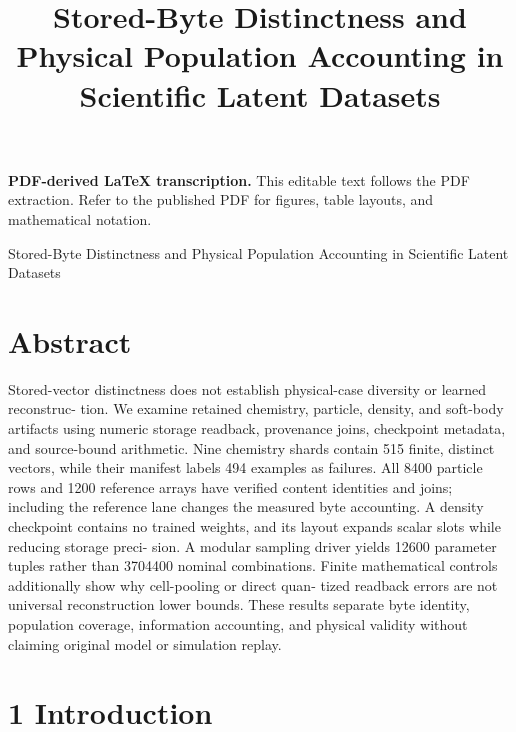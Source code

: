 \documentclass[11pt]{article}
\title{Stored-Byte Distinctness and Physical Population Accounting in Scientific Latent Datasets}
\author{}
\date{}
\begin{document}
\maketitle
\noindent\textbf{PDF-derived LaTeX transcription.} This editable text follows the PDF extraction. Refer to the published PDF for figures, table layouts, and mathematical notation.


Stored-Byte Distinctness and Physical Population Accounting in
Scientific Latent Datasets

\section*{Abstract}

Stored-vector distinctness does not establish physical-case diversity or learned reconstruc-
tion. We examine retained chemistry, particle, density, and soft-body artifacts using numeric
storage readback, provenance joins, checkpoint metadata, and source-bound arithmetic. Nine
chemistry shards contain 515 finite, distinct vectors, while their manifest labels 494 examples
as failures. All 8400 particle rows and 1200 reference arrays have verified content identities and
joins; including the reference lane changes the measured byte accounting. A density checkpoint
contains no trained weights, and its layout expands scalar slots while reducing storage preci-
sion. A modular sampling driver yields 12600 parameter tuples rather than 3704400 nominal
combinations. Finite mathematical controls additionally show why cell-pooling or direct quan-
tized readback errors are not universal reconstruction lower bounds. These results separate byte
identity, population coverage, information accounting, and physical validity without claiming
original model or simulation replay.

\section*{1 Introduction}
\end{document}
